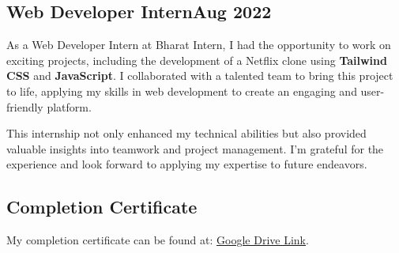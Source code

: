 \subsection{{Web Developer Intern\hfill Aug 2022 }}
\begin{zitemize}
    \item As a Web Developer Intern at Bharat Intern, I had the opportunity to work on exciting projects, including the development of a Netflix clone using \textbf{Tailwind CSS} and \textbf{JavaScript}. I collaborated with a talented team to bring this project to life, applying my skills in web development to create an engaging and user-friendly platform. 
    \item This internship not only enhanced my technical abilities but also provided valuable insights into teamwork and project management. I'm grateful for the experience and look forward to applying my expertise to future endeavors.

\subsection{{Completion Certificate}}
My completion certificate can be found at: \href{https://drive.google.com/file/d/1kW9k5gszJlIEXFur_P-q36PIus9H_Qyk/view?usp=drivesdk}{Google Drive Link}.
\end{zitemize}


